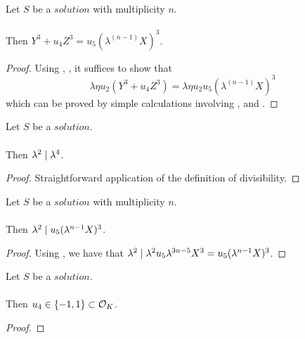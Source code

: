 \begin{lemma}
    \label{lmm:formula2}
    \leanok
    Let $S$ be a $solution$ with multiplicity $n$.\\\\
    Then $Y^3 + u_4 Z^3 = u_5 (\lambda^(n-1) X)^3$.
\end{lemma}
\begin{proof}
    \leanok
    Using , , it suffices to show that
    $$\lambda \eta u_2 (Y^3 + u_4 Z^3) = \lambda \eta u_2 u_5 (\lambda^(n-1) X)^3$$
    which can be proved by simple calculations involving ,
     and .
\end{proof}

\begin{lemma}
    \label{lmm:lambda_sq_div_lambda_fourth}
    \leanok
    Let $S$ be a $solution$.\\\\
    Then $\lambda^2 \mid \lambda^4$.
\end{lemma}
\begin{proof}
    \leanok
    Straightforward application of the definition of divisibility.
\end{proof}

\begin{lemma}
    \label{lmm:lambda_sq_div_new_X_cubed}
    \leanok
    Let $S$ be a $solution$ with multiplicity $n$.\\\\
    Then $\lambda^2 \mid u_5 (\lambda^{n - 1} X)^3$.
\end{lemma}
\begin{proof}
    \leanok
    Using , we have that $\lambda^2 \mid
    \lambda^2 u_5 \lambda^{3n-5} X^3 = u_5 (\lambda^{n - 1} X)^3$.
\end{proof}

\begin{lemma}
    \label{lmm:by_kummer}
    \leanok
    Let $S$ be a $solution$.\\\\
    Then $u_4 \in \left\{-1,1\right\} \subset \mathcal{O}_K$.
\end{lemma}
\begin{proof}
    \leanok
\end{proof}

